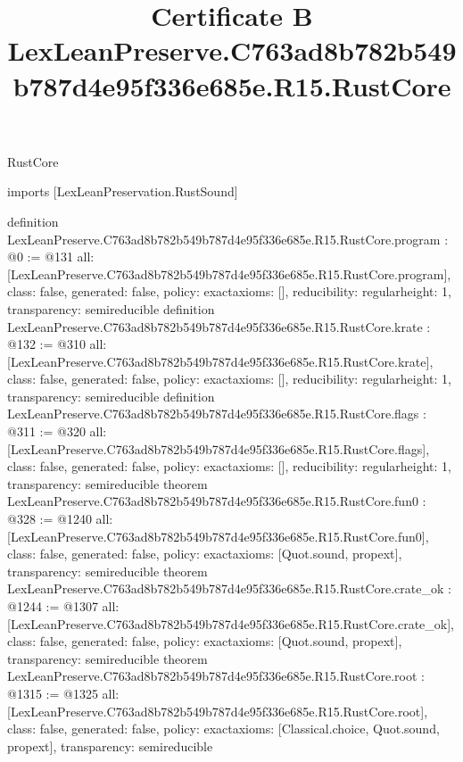 \begin{lexlean}{RustCore}
\title{Certificate B LexLeanPreserve.C763ad8b782b549b787d4e95f336e685e.R15.RustCore}
\begin{coremodule}
imports [LexLeanPreservation.RustSound]

definition LexLeanPreserve.C763ad8b782b549b787d4e95f336e685e.R15.RustCore.program : @0 := @131 {
  all: [LexLeanPreserve.C763ad8b782b549b787d4e95f336e685e.R15.RustCore.program],
  class: false,
  generated: false,
  policy: exact{axioms: []},
  reducibility: regular{height: 1},
  transparency: semireducible
}
definition LexLeanPreserve.C763ad8b782b549b787d4e95f336e685e.R15.RustCore.krate : @132 := @310 {
  all: [LexLeanPreserve.C763ad8b782b549b787d4e95f336e685e.R15.RustCore.krate],
  class: false,
  generated: false,
  policy: exact{axioms: []},
  reducibility: regular{height: 1},
  transparency: semireducible
}
definition LexLeanPreserve.C763ad8b782b549b787d4e95f336e685e.R15.RustCore.flags : @311 := @320 {
  all: [LexLeanPreserve.C763ad8b782b549b787d4e95f336e685e.R15.RustCore.flags],
  class: false,
  generated: false,
  policy: exact{axioms: []},
  reducibility: regular{height: 1},
  transparency: semireducible
}
theorem LexLeanPreserve.C763ad8b782b549b787d4e95f336e685e.R15.RustCore.fun0 : @328 := @1240 {
  all: [LexLeanPreserve.C763ad8b782b549b787d4e95f336e685e.R15.RustCore.fun0],
  class: false,
  generated: false,
  policy: exact{axioms: [Quot.sound, propext]},
  transparency: semireducible
}
theorem LexLeanPreserve.C763ad8b782b549b787d4e95f336e685e.R15.RustCore.crate_ok : @1244 := @1307 {
  all: [LexLeanPreserve.C763ad8b782b549b787d4e95f336e685e.R15.RustCore.crate_ok],
  class: false,
  generated: false,
  policy: exact{axioms: [Quot.sound, propext]},
  transparency: semireducible
}
theorem LexLeanPreserve.C763ad8b782b549b787d4e95f336e685e.R15.RustCore.root : @1315 := @1325 {
  all: [LexLeanPreserve.C763ad8b782b549b787d4e95f336e685e.R15.RustCore.root],
  class: false,
  generated: false,
  policy: exact{axioms: [Classical.choice, Quot.sound, propext]},
  transparency: semireducible
}


\end{coremodule}
\end{lexlean}
